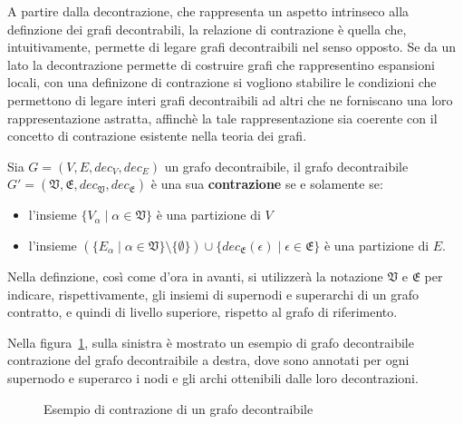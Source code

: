 
    \label{subsec:contrazioni}
    A partire dalla decontrazione, che rappresenta un aspetto intrinseco alla definzione dei grafi decontrabili,
    la relazione di contrazione \`e quella che, intuitivamente, permette di legare grafi decontraibili nel senso
    opposto.
    Se da un lato la decontrazione permette di costruire grafi che rappresentino espansioni locali, con una
    definizone di contrazione si vogliono stabilire le condizioni che permettono di legare interi grafi decontraibili
    ad altri che ne forniscano una loro rappresentazione astratta, affinch\`e la tale rappresentazione
    sia coerente con il concetto di contrazione esistente nella teoria dei grafi.

    \begin{definition}
        Sia $G = (V, E, dec_V, dec_E)$ un grafo decontraibile, il grafo decontraibile
        $G\mathcal{'} = (\mathfrak{V}, \mathfrak{E}, dec_{\mathfrak{V}}, dec_{\mathfrak{E}})$ \`e una sua
        \textbf{contrazione} se e solamente se:
            \begin{itemize}
                \item l'insieme $\{V_\alpha \mid \alpha \in \mathfrak{V}\}$ \`e una partizione di $V$
                \item l'insieme $(\{E_\alpha \mid \alpha \in \mathfrak{V}\} \setminus \{ \emptyset \}) \cup
                    \{ dec_{\mathfrak{E}}(\epsilon) \mid \epsilon \in \mathfrak{E}\}$ \`e una partizione di $E$.
            \end{itemize}
    \end{definition}

    Nella definzione, cos\`{i} come d'ora in avanti, si utilizzer\`a la notazione $\mathfrak{V}$ e $\mathfrak{E}$ per
    indicare, rispettivamente, gli insiemi di supernodi e superarchi di un grafo contratto, e quindi di livello
    superiore, rispetto al grafo di riferimento. \newline

    Nella figura~\ref{fig:contraction-example}, sulla sinistra \`e mostrato un esempio di grafo decontraibile
    contrazione del grafo decontraibile a destra, dove sono annotati per ogni supernodo e superarco
    i nodi e gli archi ottenibili dalle loro decontrazioni. \newline

    \begin{figure}
        \centering
        
        \caption{Esempio di contrazione di un grafo decontraibile}
        \label{fig:contraction-example}
    \end{figure}

